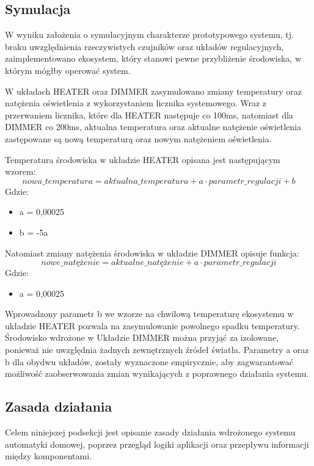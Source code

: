     \subsection{Symulacja}
    W wyniku założenia o symulacyjnym charakterze prototypowego systemu, tj. braku uwzględnienia rzeczywistych czujników oraz układów regulacyjnych, zaimplementowano ekosystem, który stanowi pewne przybliżenie środowiska, w którym mógłby operować system. 

    W układach HEATER oraz DIMMER zasymulowano zmiany temperatury oraz natężenia oświetlenia z wykorzystaniem licznika systemowego. Wraz z przerwaniem licznika, które dla HEATER następuje co 100ms, natomiast dla DIMMER co 200ms, aktualna temperatura oraz aktualne natężenie oświetlenia zastępowane są nową temperaturą oraz nowym natężeniem oświetlenia. 

    Temperatura środowiska w układzie HEATER opisana jest następującym wzorem:
        \[nowa\_temperatura = aktualna\_temperatura + a\cdot parametr\_regulacji + b\]
    Gdzie:
    \begin{itemize}
        \item a = 0,00025
        \item b = -5a 
    \end{itemize}

    Natomiast zmiany natężenia środowiska w układzie DIMMER opisuje funkcja:
    \[nowe\_natężenie= aktualne\_natężenie + a\cdot parametr\_regulacji\]
    Gdzie:
    \begin{itemize}
        \item a = 0,00025
    \end{itemize}

    Wprowadzony parametr b we wzorze na chwilową temperaturę ekosystemu w układzie HEATER pozwala na zasymulowanie powolnego spadku temperatury. Środowisko wdrożone w Układzie DIMMER można przyjąć za izolowane, ponieważ nie uwzględnia żadnych zewnętrznych źródeł światła.
    Parametry a oraz b dla obydwu układów, zostały wyznaczone empirycznie, aby zagwarantować możliwość zaobserwowania zmian wynikających z poprawnego działania systemu.
    
    \subsection{Zasada działania}
    \label{subsec:system-behaviour}

    Celem niniejszej podsekcji jest opisanie zasady działania wdrożonego systemu automatyki domowej, poprzez przegląd logiki aplikacji oraz przepływu informacji między komponentami.
    
